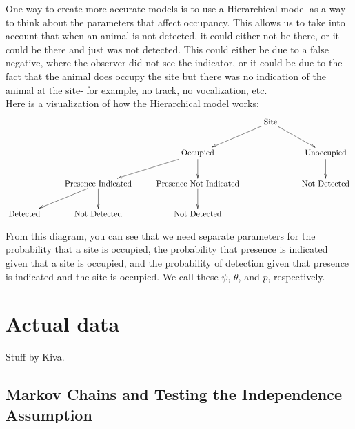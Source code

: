 \documentclass{article}
\begin{document}
	One way to create more accurate models is to use a Hierarchical model as a 
way to think about the parameters that affect occupancy.  This allows us to take
into account that when an animal is not detected, it could either not be there, 
or it could be there and just was not detected.  This could either be due to
a false negative, where the observer did not see the indicator, or it could be 
due to the fact that the animal does occupy the site but there was no indication
of the animal at the site- for example, no track, no vocalization, etc.  \\
Here is a visualization of how the Hierarchical model works:
	\begin{displaymath}
		\xymatrix{          	   &                                  		 &                               		&\text{Site} \ar[dl] \ar[dr] & \\
				            	   &                                  		 & \text{Occupied} \ar[dl] \ar[d]		&                            & \text{Unoccupied} \ar[d] \\
				            	   & \text{Presence Indicated} \ar[dl] \ar[d]& \text{Presence Not Indicated} \ar[d]&                            & \text{Not Detected} \\
				   \text{Detected} & \text{Not Detected}              		 & \text{Not Detected}                  &                            &   }
	\end{displaymath}

From this diagram, you can see that we need separate parameters for the 
probability that a site is occupied, the probability that presence is indicated
given that a site is occupied, and the probability of detection given that 
presence is indicated and the site is occupied.  We call these \(\psi\),
\(\theta\), and \(p\), respectively.

\section{Actual data}
Stuff by Kiva.

	\subsection{Markov Chains and Testing the Independence Assumption}
\end{document}
